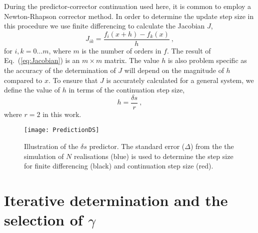 \documentclass[11pt]{article}
\begin{document}
During the predictor-corrector continuation used here, it is common to employ a Newton-Rhapson corrector method. In order to determine the update step size in this procedure we use finite differencing to calculate the Jacobian $J$,
\begin{equation}
	J_{ik} = \frac{f_i(x+h) - f_k(x)}{h}~,
	\label{eq:Jacobian}
\end{equation}
for $i,k = 0 \dots m$, where $m$ is the number of orders in $f$. The result of Eq.~(\ref{eq:Jacobian}) is an $m \times m$ matrix. The value $h$ is also problem specific as the accuracy of the determination of $J$ will depend on the magnitude of $h$ compared to $x$. To ensure that $J$ is accurately calculated for a general system, we define the value of $h$ in terms of the continuation step size,
\begin{equation}
	h = \frac{\delta s}{r}~,
	\label{eq:h}
\end{equation}
where $r=2$ in this work. 

\begin{figure}[t]
	\centering
	\texttt{[image: PredictionDS]}
	\caption{Illustration of the $\delta s$ predictor. The standard error ($\Delta$) from the the simulation of $N$ realisations (blue) is used to determine the step size for finite differencing (black) and continuation step size (red). \label{fig:dsPredictor}}
\end{figure}



\section{Iterative determination and the selection of $\gamma$} 
\end{document}
